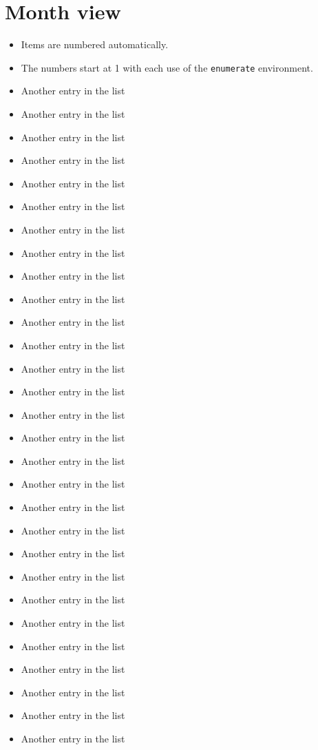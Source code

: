 \documentclass[a4paper]{article}
\begin{document}
\section{Month view}
\begin{itemize}
	\item Items are numbered automatically.
	\item The numbers start at 1 with each use of the \texttt{enumerate} environment.
	\item Another entry in the list
	\item Another entry in the list
	\item Another entry in the list
	\item Another entry in the list
	\item Another entry in the list
	\item Another entry in the list
	\item Another entry in the list
	\item Another entry in the list
	\item Another entry in the list
	\item Another entry in the list
	\item Another entry in the list
	\item Another entry in the list
	\item Another entry in the list
	\item Another entry in the list
	\item Another entry in the list
	\item Another entry in the list
	\item Another entry in the list
	\item Another entry in the list
	\item Another entry in the list
	\item Another entry in the list
	\item Another entry in the list
	\item Another entry in the list
	\item Another entry in the list
	\item Another entry in the list
	\item Another entry in the list
	\item Another entry in the list
	\item Another entry in the list
	\item Another entry in the list
	\item Another entry in the list
\end{itemize}	
\newpage
\end{document}
